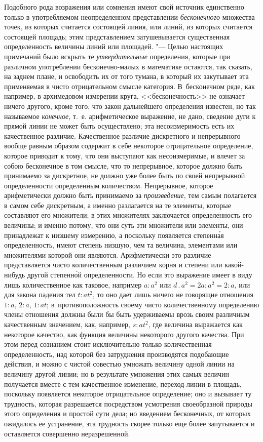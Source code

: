Подобного рода возражения или сомнения имеют свой источник единственно только в
употребляемом неопределенном представлении {\em бесконечного} множества точек,
из которых считается состоящей линия, или линий, из которых считается состоящей
площадь; этим представлением затушевывается существенная определенность
величины линий или площадей. "--- Целью настоящих примечаний было вскрыть те
{\em утвердительные} определения, которые при различном употреблении
бесконечно-малых в математике остаются, так сказать, на заднем плане, и
освободить их от того тумана, в который их закутывает эта применяемая в чисто
отрицательном смысле категория. В~бесконечном ряде, как например, в архимедовом
измерении круга, <<бесконечность>> не означает ничего другого, кроме того, что
закон дальнейшего определения известен, но так называемое {\em конечное}, т.~е.
арифметическое выражение, не дано, сведение дуги к прямой линии не может быть
осуществлено; эта несоизмеримость есть их качественное различие. Качественное
различие дискретного и непрерывного вообще равным образом содержит в себе
некоторое отрицательное определение, которое приводит к тому, что они выступают
как несоизмеримые, и влечет за собою бесконечное в том смысле, что то
непрерывное, которое должно быть принимаемо за дискретное, не должно уже более
быть по своей непрерывной определенности определенным количеством. Непрерывное,
которое арифметически должно быть принимаемо за {\em произведение}, тем самым
полагается в самом себе дискретным, а именно разлагается на те элементы,
которые составляют его множители; в этих множителях заключается определенность
его величины; и именно потому, что они суть эти множители или элементы, они
принадлежат к низшему измерению, а поскольку появляется степенн\'{а}я
определенность, имеют степень низшую, чем та величина, элементами или
множителями которой они являются. Арифметически это различие представляется
чисто количественным различием корня и степени или какой-нибудь другой
степенн\'{о}й определенности. Но если это выражение имеет в виду лишь
количественное как таковое, например $a:a^2$ или $d\,.\,a^2=2a:a^2=2:a$, или
для закона падения тел $t:at^2$, то оно дает лишь ничего не говорящие отношения
$1:a$, $2:a$, $1:at$; в~противоположность своему чисто количественному
определению члены отношения должны были бы быть удерживаемы врозь своим
различным качественным значением, как, например, $s:at^2$, где величина
выражается как некоторое качество, как функция величины некоторого другого
качества. При этом перед сознанием стоит исключительно только количественная
определенность, над которой без затруднения производятся подобающие действия,
и можно с чистой совестью умножать величину одной линии на величину другой
линии; но в результате умножения этих самых величин получается вместе с тем
качественное изменение, переход линии в площадь, поскольку появляется некоторое
отрицательное определение; оно и вызывает ту трудность, которая разрешается
посредством усмотрения своеобразной природы этого определения и простой сути
дела; но введением бесконечных, от которых ожидалось ее устранение, эта
трудность скорее только еще более запутывается и оставляется совершенно
неразрешенной.
